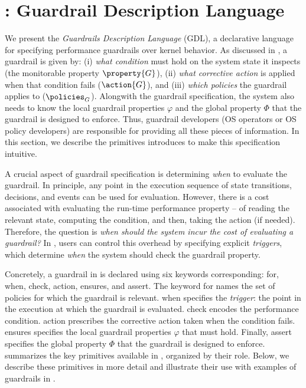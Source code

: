 \section{\lang: Guardrail Description Language}\label{sec:gdl}

We present the \emph{Guardrails Description Language} (GDL), a declarative language for specifying performance guardrails over kernel behavior.
As discussed in , a guardrail is given by: (i) \emph{what condition} must hold on the system state it inspects (the monitorable property $\property{G}$), (ii) \emph{what corrective action} is applied when that condition fails ($\action{G}$), and (iii) \emph{which policies} the guardrail applies to ($\policies_G$).
Alongwith the guardrail specification, the system also needs to know the local guardrail properties $\varphi$ and the global \perfsafety property $\Phi$ that the guardrail is designed to enforce.
Thus, guardrail developers (OS operators or OS policy developers) are responsible for providing all these pieces of information.
In this section, we describe the primitives \lang introduces to make this specification intuitive.

A crucial aspect of guardrail specification is determining \emph{when} to evaluate the guardrail.
In principle, any point in the execution sequence of state transitions, decisions, and events can be used for evaluation.
However, there is a cost associated with evaluating the run-time performance property -- of reading the relevant state, computing the condition, and then, taking the action (if needed).
Therefore, the question is {\it when should the system incur the cost of evaluating a guardrail?}
In \lang, users can control this overhead by specifying explicit {\em triggers}, which determine \emph{when} the system should check the guardrail property.

Concretely, a guardrail in \lang is declared using six keywords corresponding: {\sf for}, {\sf when}, {\sf check}, {\sf action}, {\sf ensures}, and {\sf assert}.
The keyword {\sf for} names the set of policies for which the guardrail is relevant.
{\sf when} specifies the \emph{trigger}: the point in the execution at which the guardrail is evaluated.
{\sf check} encodes the performance condition.
{\sf action} prescribes the corrective action taken when the condition fails.
{\sf ensures} specifies the local guardrail properties $\varphi$ that must hold.
Finally, {\sf assert} specifies the global \perfsafety property $\Phi$ that the guardrail is designed to enforce.
 summarizes the key primitives available in \lang, organized by their role.
Below, we describe these primitives in more detail and illustrate their use with examples of guardrails in \lang.

